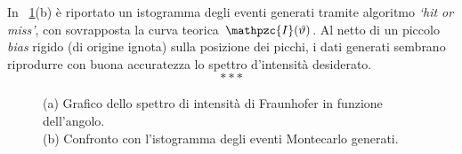 \noindent In \figurename~\ref{fig:TheoryVsMontecarlo}(b) è riportato un istogramma degli eventi generati tramite algoritmo \emph{`hit or miss'}, con sovrapposta la curva teorica $\mathpzc{I}(\vartheta)$. Al netto di un piccolo \emph{bias} rigido (di origine ignota) sulla posizione dei picchi, i dati generati sembrano riprodurre con buona accuratezza lo spettro d'intensità desiderato. \\

\[* * * \] \medskip

\captionsetup*[subfigure]{position=top}
\begin{figure}
	\centering
	\caption{(a) Grafico dello spettro di intensità di Fraunhofer in funzione dell'angolo.\\
		(b) Confronto con l'istogramma degli eventi Montecarlo generati.}
	\label{fig:FraunhoferTheory}
	\label{fig:TheoryVsMontecarlo}
\end{figure}

